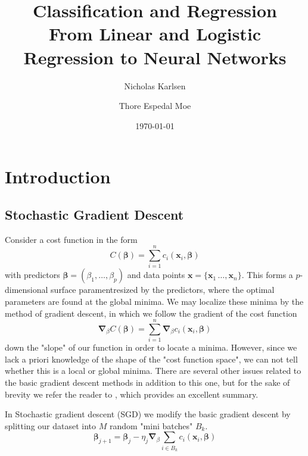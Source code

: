 \documentclass[reprint, english, nofootinbib]{revtex4-2}
\begin{document}
\title{Classification and Regression\\
\normalsize{From Linear and Logistic Regression to Neural Networks}}

\author{Nicholas Karlsen}
\author{Thore Espedal Moe}
\date{\today}

\begin{abstract}
\end{abstract}

\maketitle

\section{Introduction}
\subsection{Stochastic Gradient Descent}
\noindent
Consider a cost function in the form
\begin{equation}
    C(\pmb\beta) = \sum_{i=1}^{n}c_i(\pmb x_i, \pmb\beta)
\end{equation}
with predictors $\pmb \beta = (\beta_1, \dots, \beta_p)$ and data points $\pmb x = \{\pmb x_1\, \dots, \pmb x_n\}$. This forms a $p$-dimensional surface paramentresized by the predictors, where the optimal parameters are found at the  global minima.
We may localize these minima by the method of gradient descent, in which we follow the gradient of the cost function
\begin{equation}
    \pmb\nabla_{\beta} C(\pmb\beta) = \sum_{i=1}^n \pmb\nabla_\beta c_i(\pmb x_i, \pmb\beta)
\end{equation}
down the "slope" of our function in order to locate a minima. However, since we lack a priori knowledge of the shape of the "cost function space", we can not tell whether this is a local or global minima. There are several other issues related to the basic gradient descent methods in addition to this one, but for the sake of brevity we refer the reader to \textcite[pp.15-16]{Mehta_2019}, which provides an excellent summary.

In Stochastic gradient descent (SGD) we modify the basic gradient descent by splitting our dataset into $M$ random "mini batches" $B_k$.
\begin{equation}
    \pmb\beta_{j + 1} = \pmb\beta_j - \eta_j\pmb\nabla_\beta\sum_{i\in B_k} c_i (\pmb x_i, \pmb \beta)
\end{equation}
\end{document}
